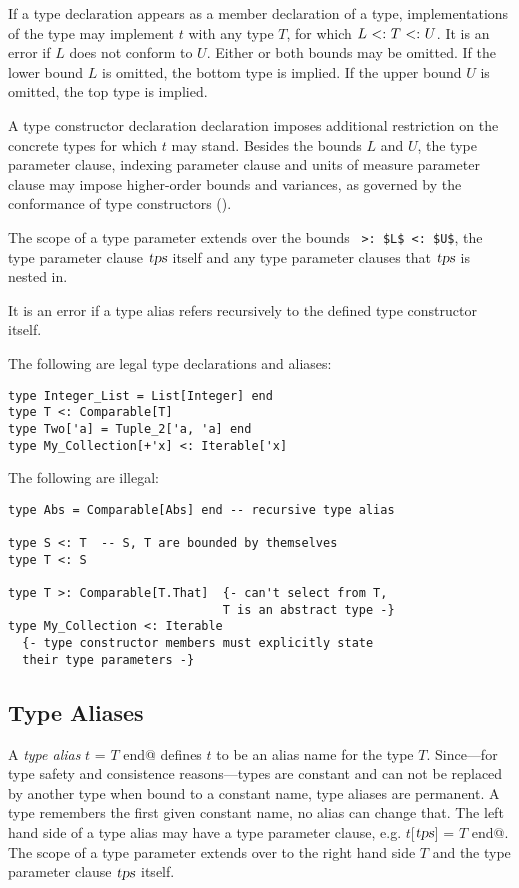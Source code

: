 If a type declaration appears as a member declaration of a type, implementations of the type may implement $t$ with any type $T$, for which $L \conforms T \conforms U$. It is an error if $L$ does not conform to $U$. Either or both bounds may be omitted. If the lower bound $L$ is omitted, the bottom type  is implied. If the upper bound $U$ is omitted, the top type  is implied. 

A type constructor declaration declaration imposes additional restriction on the concrete types for which $t$ may stand. Besides the bounds $L$ and $U$, the type parameter clause, indexing parameter clause and units of measure parameter clause may impose higher-order bounds and variances, as governed by the conformance of type constructors ().

The scope of a type parameter extends over the bounds ~\lstinline!>: $L$ <: $U$!, the type parameter clause $\mbox{\sl tps}$ itself and any type parameter clauses that $\mbox{\sl tps}$ is nested in.

It is an error if a type alias refers recursively to the defined type constructor itself. 

\example The following are legal type declarations and aliases:
\begin{lstlisting}
type Integer_List = List[Integer] end
type T <: Comparable[T]
type Two['a] = Tuple_2['a, 'a] end
type My_Collection[+'x] <: Iterable['x]
\end{lstlisting}

The following are illegal:
\begin{lstlisting}
type Abs = Comparable[Abs] end -- recursive type alias

type S <: T  -- S, T are bounded by themselves
type T <: S

type T >: Comparable[T.That]  {- can't select from T,
                              T is an abstract type -}
type My_Collection <: Iterable
  {- type constructor members must explicitly state
  their type parameters -}
\end{lstlisting}

\subsection{Type Aliases}
A {\em type alias} \lstinline@type $t$ = $T$ end@ defines $t$ to be an alias name for the type $T$. Since---for type safety and consistence reasons---types are constant and can not be replaced by another type when bound to a constant name, type aliases are permanent. A type remembers the first given constant name, no alias can change that. The left hand side of a type alias may have a type parameter clause, e.g. \lstinline@type $t$[$\mbox{\sl tps}$] = $T$ end@. The scope of a type parameter extends over to the right hand side $T$ and the type parameter clause $\mbox{\sl tps}$ itself. 

